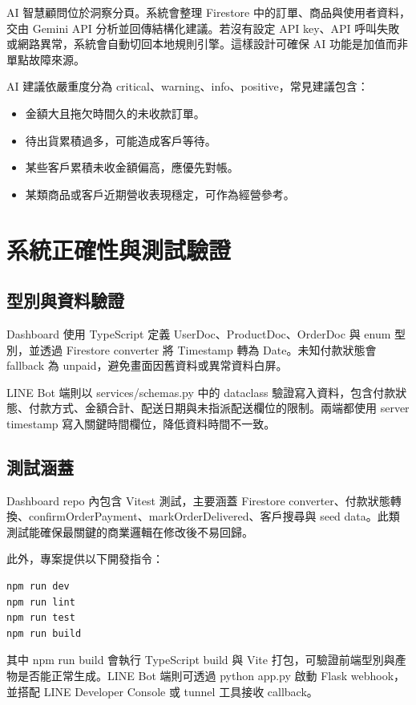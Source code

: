 \documentclass[12pt,a4paper,UTF8,fontset=none]{ctexart}
\newcommand{\code}[1]{{\ttfamily\small #1}}
\begin{document}
AI 智慧顧問位於洞察分頁。系統會整理 Firestore 中的訂單、商品與使用者資料，交由 Gemini API 分析並回傳結構化建議。若沒有設定 API key、API 呼叫失敗或網路異常，系統會自動切回本地規則引擎。這樣設計可確保 AI 功能是加值而非單點故障來源。

AI 建議依嚴重度分為 critical、warning、info、positive，常見建議包含：

\begin{itemize}
  \item 金額大且拖欠時間久的未收款訂單。
  \item 待出貨累積過多，可能造成客戶等待。
  \item 某些客戶累積未收金額偏高，應優先對帳。
  \item 某類商品或客戶近期營收表現穩定，可作為經營參考。
\end{itemize}

\section{系統正確性與測試驗證}

\subsection{型別與資料驗證}

Dashboard 使用 TypeScript 定義 \code{UserDoc}、\code{ProductDoc}、\code{OrderDoc} 與 enum 型別，並透過 Firestore converter 將 Timestamp 轉為 Date。未知付款狀態會 fallback 為 \code{unpaid}，避免畫面因舊資料或異常資料白屏。

LINE Bot 端則以 \code{services/schemas.py} 中的 dataclass 驗證寫入資料，包含付款狀態、付款方式、金額合計、配送日期與未指派配送欄位的限制。兩端都使用 server timestamp 寫入關鍵時間欄位，降低資料時間不一致。

\subsection{測試涵蓋}

Dashboard repo 內包含 Vitest 測試，主要涵蓋 Firestore converter、付款狀態轉換、\code{confirmOrderPayment}、\code{markOrderDelivered}、客戶搜尋與 seed data。此類測試能確保最關鍵的商業邏輯在修改後不易回歸。

此外，專案提供以下開發指令：

\begin{verbatim}
npm run dev
npm run lint
npm run test
npm run build
\end{verbatim}

其中 \code{npm run build} 會執行 TypeScript build 與 Vite 打包，可驗證前端型別與產物是否能正常生成。LINE Bot 端則可透過 \code{python app.py} 啟動 Flask webhook，並搭配 LINE Developer Console 或 tunnel 工具接收 callback。
\end{document}

